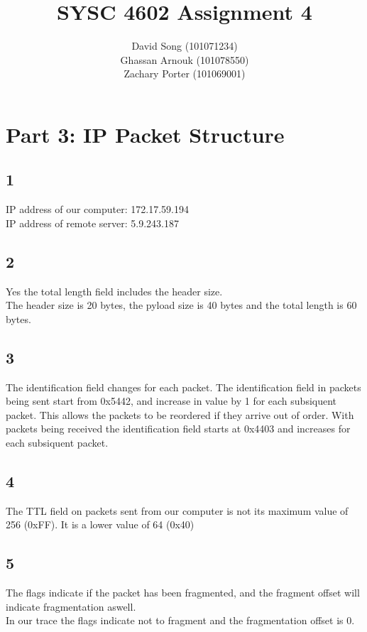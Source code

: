 \documentclass{article}
\begin{document}
    \title  { \textbf{SYSC 4602 Assignment 4} }
    \author {
        David Song (101071234)\\
        Ghassan Arnouk (101078550)\\
        Zachary Porter (101069001)
    }

    \maketitle

    \clearpage
    \section*{Part 3: IP Packet Structure}
    \subsection*{1}
    IP address of our computer: 172.17.59.194\\
    IP address of remote server: 5.9.243.187\\
    \subsection*{2}
    Yes the total length field includes the header size.\\
    The header size is 20 bytes, the pyload size is 40 bytes and the total length is 60 bytes.\\
    \subsection*{3}
    The identification field changes for each packet. The identification field in packets being sent start from 0x5442, and increase in value by 1 for each subsiquent packet. This allows the packets to be reordered if they arrive out of order. With packets being received the identification field starts at 0x4403 and increases for each subsiquent packet.
    \subsection*{4}
    The TTL field on packets sent from our computer is not its maximum value of 256 (0xFF). It is a lower value of 64 (0x40)
    \subsection*{5}
    The flags indicate if the packet has been fragmented, and the fragment offset will indicate fragmentation aswell.\\
    In our trace the flags indicate not to fragment and the fragmentation offset is 0.
\end{document}
